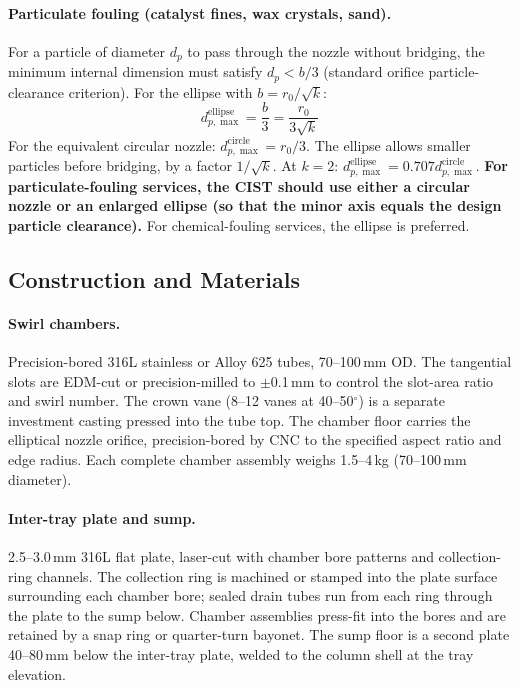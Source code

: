 \documentclass[11pt,letterpaper]{article}
\begin{document}
\paragraph{Particulate fouling (catalyst fines, wax crystals, sand).}
For a particle of diameter $d_p$ to pass through the nozzle without bridging,
the minimum internal dimension must satisfy $d_p < b/3$ (standard orifice
particle-clearance criterion).  For the ellipse with $b = r_0/\sqrt{k}$:
\begin{equation}
  d_{p,\max}^{\mathrm{ellipse}} = \frac{b}{3} = \frac{r_0}{3\sqrt{k}}
  \label{eq:dp_max}
\end{equation}
For the equivalent circular nozzle: $d_{p,\max}^{\mathrm{circle}} = r_0/3$.
The ellipse allows smaller particles before bridging, by a factor $1/\sqrt{k}$.
At $k = 2$: $d_{p,\max}^{\mathrm{ellipse}} = 0.707 d_{p,\max}^{\mathrm{circle}}$.
\textbf{For particulate-fouling services, the CIST should use either a
circular nozzle or an enlarged ellipse (so that the minor axis equals the
design particle clearance).}  For chemical-fouling services, the ellipse is
preferred.

\subsection{Construction and Materials}
\label{sec:construction}

\paragraph{Swirl chambers.}
Precision-bored 316L stainless or Alloy 625 tubes, 70--100\,mm OD.  The
tangential slots are EDM-cut or precision-milled to $\pm$0.1\,mm to
control the slot-area ratio and swirl number.  The crown vane (8--12 vanes
at 40--50\ensuremath{^\circ}) is a separate investment casting pressed into
the tube top.  The chamber floor carries the elliptical nozzle orifice,
precision-bored by CNC to the specified aspect ratio and edge radius.  Each
complete chamber assembly weighs 1.5--4\,kg (70--100\,mm diameter).

\paragraph{Inter-tray plate and sump.}
2.5--3.0\,mm 316L flat plate, laser-cut with chamber bore patterns and
collection-ring channels.  The collection ring is machined or stamped into
the plate surface surrounding each chamber bore; sealed drain tubes run
from each ring through the plate to the sump below.  Chamber assemblies
press-fit into the bores and are retained by a snap ring or quarter-turn
bayonet.  The sump floor is a second plate 40--80\,mm below the inter-tray
plate, welded to the column shell at the tray elevation.
\end{document}
